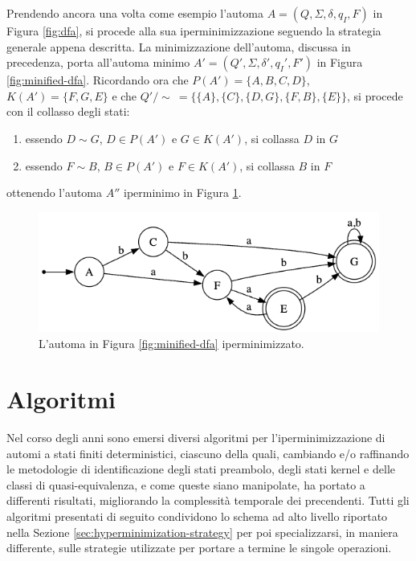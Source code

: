 \documentclass[a4paper,12pt]{report} %
\newcommand{\partitioned}[2]{#1\slash\!\!#2}  %
\begin{document}
Prendendo ancora una volta come esempio l'automa $A = (Q, \Sigma, \delta, q_I, F)$ in Figura \ref{fig:dfa},
si procede alla sua iperminimizzazione seguendo la strategia generale appena descritta.
La minimizzazione dell'automa, discussa in precedenza, porta all'automa minimo $A' = (Q', \Sigma, \delta', q_I', F')$
in Figura \ref{fig:minified-dfa}.
Ricordando ora che $P(A') = \{ A, B, C, D \}$, $K(A') = \{ F, G, E \}$ e che 
$\partitioned{Q'}{\sim} \ = \{ \{ A \}, \{ C \}, \{ D, G \}, \{ F, B \}, \{ E \} \}$,
si procede con il collasso degli stati:
\begin{enumerate}[label=--]
  \item essendo $D \sim G$, $D \in P(A')$ e $G \in K(A')$, si collassa $D$ in $G$
  \item essendo $F \sim B$, $B \in P(A')$ e $F \in K(A')$, si collassa $B$ in $F$
\end{enumerate}
ottenendo l'automa $A''$ iperminimo in Figura \ref{fig:hyper-minified-dfa}.

\begin{figure}[hbt!]
  \centering
  \includegraphics[width=0.7\linewidth]{images/hyper_minified_dfa.png}
  \caption{\label{fig:hyper-minified-dfa}L'automa in Figura \ref{fig:minified-dfa} iperminimizzato.}
\end{figure}

\section{Algoritmi}

Nel corso degli anni sono emersi diversi algoritmi per l'iperminimizzazione di automi a stati finiti deterministici,
ciascuno della quali, cambiando e/o raffinando le metodologie di identificazione degli stati preambolo, degli 
stati kernel e delle classi di quasi-equivalenza, e come queste siano manipolate, ha portato a differenti risultati,
migliorando la complessità temporale dei precendenti. Tutti gli algoritmi presentati di seguito condividono lo schema
ad alto livello riportato nella Sezione \ref{sec:hyperminimization-strategy} per poi specializzarsi,
in maniera differente, sulle strategie utilizzate per portare a termine le singole operazioni.
\end{document}

